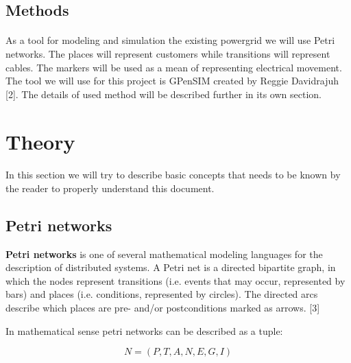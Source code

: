 \documentclass[a4paper]{article}
\begin{document}
\subsection{Methods}
\label{sec:methods}
\paragraph{}
As a tool for modeling and simulation the existing powergrid we will use Petri networks. The places will represent customers while transitions will represent cables. The markers will be used as a mean of representing electrical movement. The tool we will use for this project is GPenSIM created by Reggie Davidrajuh [2]. The details of used method will be described further in its own section.

\clearpage

%
\section{Theory}
\label{cha:theory}
\paragraph{}
In this section we will try to describe basic concepts that needs to be known by the reader to properly understand this document.

\subsection{Petri networks}
\label{sec:petriNetworks}
\textbf{Petri networks} is one of several mathematical modeling languages for the description of distributed systems. A Petri net is a directed bipartite graph, in which the nodes represent transitions (i.e. events that may occur, represented by bars) and places (i.e. conditions, represented by circles). The directed arcs describe which places are pre- and/or postconditions marked  as arrows. [3]

In mathematical sense petri networks can be described as a tuple:

\begin{equation}
N = ( P, T, A, N, E, G, I )
\end{equation}
\end{document}
